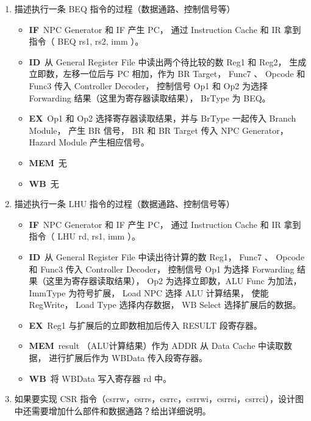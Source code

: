 \documentclass[UTF8]{article}
\begin{document}
\begin{enumerate}
    \item 描述执行一条 BEQ 指令的过程（数据通路、控制信号等）

    \begin{itemize}
        \item \textbf{IF}\ NPC Generator 和 IF 产生 PC，
        通过 Instruction Cache 和 IR 拿到指令（ BEQ rs1, rs2, imm ）。
        \item \textbf{ID}\ 从 General Register File 中读出两个待比较的数 Reg1 和 Reg2，
        生成立即数，左移一位后与 PC 相加，作为 BR Target，
        Func7 、 Opcode 和 Func3 传入 Controller Decoder，
        控制信号 Op1 和 Op2 为选择 Forwarding 结果（这里为寄存器读取结果），
        BrType 为 BEQ。
        \item \textbf{EX}\ Op1 和 Op2 选择寄存器读取结果，并与 BrType 一起传入 Branch Module，
        产生 BR 信号， BR 和 BR Target 传入 NPC Generator， Hazard Module 产生相应信号。
        \item \textbf{MEM}\ 无
        \item \textbf{WB}\ 无
    \end{itemize}
    
    \item 描述执行一条 LHU 指令的过程（数据通路、控制信号等）
    \begin{itemize}
        \item \textbf{IF}\ NPC Generator 和 IF 产生 PC，
        通过 Instruction Cache 和 IR 拿到指令（ LHU rd, rs1, imm ）。
        \item \textbf{ID}\ 从 General Register File 中读出待计算的数 Reg1，
        Func7 、 Opcode 和 Func3 传入 Controller Decoder，
        控制信号 Op1 为选择 Forwarding 结果（这里为寄存器读取结果）， Op2 为选择立即数，ALU Func 为加法，
        ImmType 为符号扩展， Load NPC 选择 ALU 计算结果，
        使能 RegWrite， Load Type 选择内存数据， WB Select 选择扩展后的数据。
        \item \textbf{EX}\ Reg1 与扩展后的立即数相加后传入 RESULT 段寄存器。
        \item \textbf{MEM}\ result （ALU计算结果）作为 ADDR 从 Data Cache 中读取数据，
        进行扩展后作为 WBData 传入段寄存器。
        \item \textbf{WB}\ 将 WBData 写入寄存器 rd 中。
    \end{itemize}
    
    \item 如果要实现 CSR 指令（csrrw，csrrs，csrrc，csrrwi，csrrsi，csrrci），设计图中还需要增加什么部件和数据通路？给出详细说明。


\end{enumerate}
\end{document}
